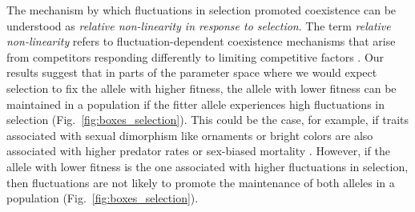 \documentclass[12pt]{article}
\begin{document}
 The mechanism by which fluctuations in selection promoted coexistence can be understood as \textit{relative non-linearity in response to selection}. The term \textit{relative non-linearity} refers to fluctuation-dependent coexistence mechanisms that arise from competitors responding differently to limiting competitive factors \citep{chesson2000general,ellner2016quantify,zepeda2019fluctuation}. Our results suggest that in parts of the parameter space where we would expect selection to fix the allele with higher fitness, the allele with lower fitness can be maintained in a population if the fitter allele experiences high fluctuations in selection (Fig.~\ref{fig:boxes_selection}). This could be the case, for example, if traits associated with sexual dimorphism like ornaments or bright colors are also associated with higher predator rates \citep{bildstein1989consequences,gotmark1997natural} or sex-biased mortality \citep{promislow1992mortality}. However, if the allele with lower fitness is the one associated with higher fluctuations in selection, then fluctuations are not likely to promote the maintenance of both alleles in a population (Fig.~\ref{fig:boxes_selection}).
\end{document}
